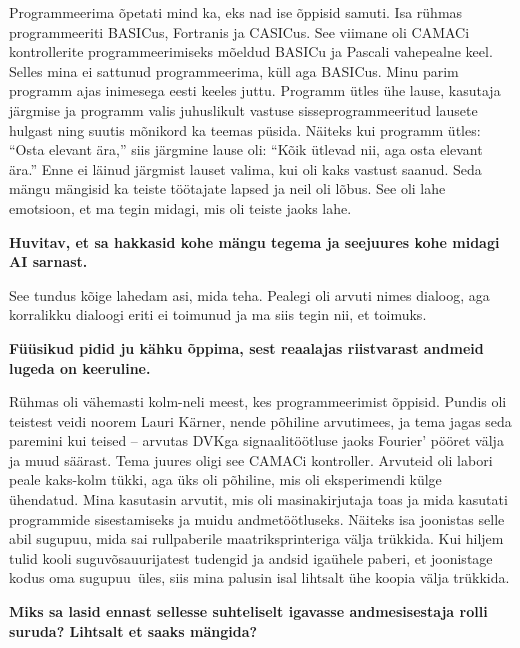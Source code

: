 Programmeerima õpetati mind ka, eks nad ise õppisid samuti. Isa rühmas
programmeeriti BASICus, Fortranis ja
CASICus. See viimane oli CAMACi kontrollerite
programmeerimiseks mõeldud BASICu ja Pascali vahepealne
keel. Selles 
mina ei sattunud programmeerima, küll aga BASICus. Minu parim
programm ajas inimesega eesti keeles juttu. Programm ütles ühe lause,
kasutaja järgmise ja programm valis juhuslikult vastuse sisseprogrammeeritud
lausete hulgast ning suutis mõnikord ka teemas püsida. Näiteks kui programm
ütles: \enquote{Osta elevant ära,} siis järgmine lause oli:
\enquote{Kõik ütlevad nii, aga osta elevant ära.} Enne ei läinud järgmist
lauset valima, kui oli kaks vastust saanud. Seda mängu mängisid ka teiste töötajate
lapsed ja neil oli lõbus. See oli lahe emotsioon, et ma tegin midagi,
mis oli teiste jaoks lahe.

\textbf{Huvitav, et sa hakkasid kohe mängu tegema ja seejuures kohe
midagi AI sarnast.}

See tundus kõige lahedam asi, mida teha. Pealegi oli arvuti nimes dialoog, aga
korralikku dialoogi eriti ei toimunud ja ma siis tegin nii, et toimuks.

\textbf{Füüsikud pidid ju kähku õppima, sest reaalajas
riistvarast andmeid lugeda on keeruline.}

Rühmas oli vähemasti kolm-neli meest, kes programmeerimist õppisid. Pundis
oli teistest veidi noorem Lauri Kärner, nende põhiline arvutimees, ja tema jagas
seda paremini kui teised -- arvutas DVKga signaalitöötluse jaoks Fourier'
pööret välja ja muud säärast. Tema juures oligi see CAMACi kontroller.
Arvuteid oli labori peale kaks-kolm tükki, aga üks oli põhiline, mis
oli eksperimendi külge ühendatud. Mina kasutasin arvutit, mis oli 
masinakirjutaja toas ja mida kasutati programmide sisestamiseks ja muidu
andmetöötluseks. Näiteks isa joonistas selle abil sugupuu, mida
sai rullpaberile maatriksprinteriga välja trükkida. Kui hiljem tulid kooli
suguvõsauurijatest tudengid ja andsid igaühele paberi, et joonistage kodus
oma sugupuu üles, siis mina palusin isal lihtsalt ühe koopia välja trükkida.

\textbf{Miks sa lasid ennast sellesse suhteliselt igavasse
andmesisestaja rolli suruda? Lihtsalt et saaks mängida?}

